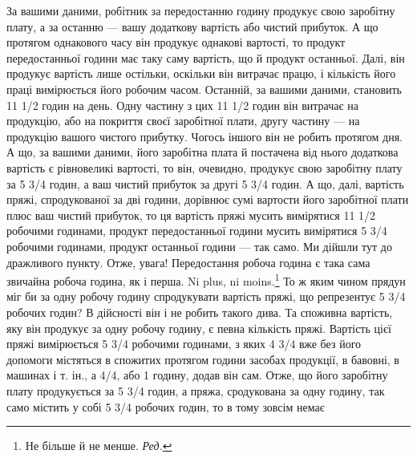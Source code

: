 За вашими даними, робітник за передостанню годину продукує свою заробітну плату, а за останню — вашу
додаткову вартість або чистий прибуток. А що протягом однакового часу він продукує
однакові вартості, то продукт передостанньої години має таку
саму вартість, що й продукт останньої. Далі, він продукує вартість лише остільки, оскільки він
витрачає працю, і кількість
його праці вимірюється його робочим часом. Останній, за вашими даними, становить 11 1/2 годин на
день. Одну частину з цих 11 1/2 годин
він витрачає на продукцію, або на покриття своєї заробітної плати, другу частину — на продукцію
вашого чистого прибутку. Чогось іншого він не робить протягом дня. А що, за вашими даними, його
заробітна плата й постачена від нього додаткова вартість є рівновеликі вартості, то він, очевидно,
продукує свою заробітну плату за 5 3/4 годин, а ваш чистий прибуток за другі
5 3/4 годин. А що, далі, вартість пряжі, спродукованої за дві години, дорівнює сумі вартости його
заробітної плати плюс ваш
чистий прибуток, то ця вартість пряжі мусить вимірятися 11 1/2 робочими
годинами, продукт передостанньої години мусить вимірятися 5 3/4 робочими годинами, продукт останньої
години — так
само. Ми дійшли тут до дражливого пункту. Отже, увага! Передостання робоча година є така сама
звичайна робоча година, як і
перша. Ni plus, ni moins.\footnote*{
Не більше й не менше. \emph{Ред.}
} То ж яким чином прядун міг би за одну робочу годину спродукувати
вартість пряжі, що репрезентує 5 3/4 робочих годин? В дійсності він і не робить такого дива. Та
споживна вартість, яку він продукує за одну робочу годину, є певна кількість пряжі. Вартість цієї
пряжі вимірюється 5 3/4 робочими годинами, з яких 4 3/4 вже без його допомоги містяться в спожитих
протягом години засобах продукції, в бавовні, в машинах і т. ін., а 4/4, або 1 годину, додав він
сам. Отже, що його заробітну плату продукується за 5 3/4 годин, а пряжа, сродукована за одну годину,
так само містить у собі 5 3/4 робочих годин, то в тому зовсім немає
\parbreak{}  %
